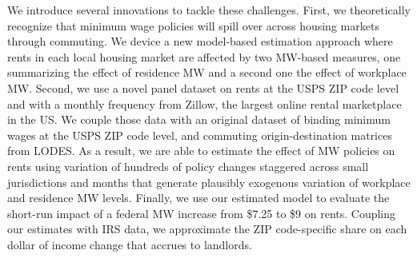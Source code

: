 We introduce several innovations to tackle these challenges.
First, we theoretically recognize that minimum wage policies will spill over across
housing markets through commuting.
We device a new model-based estimation approach where rents in each local housing 
market are affected by two MW-based measures, one summarizing the effect of residence 
MW and a second one the effect of workplace MW.
Second, we use a novel panel dataset on rents at the USPS ZIP code level and with a
monthly frequency from Zillow, the largest online rental marketplace in the US.
We couple those data with an original dataset of binding minimum wages at the USPS
ZIP code level, and commuting origin-destination matrices from LODES.
As a result, we are able to estimate the effect of MW policies on rents using 
variation of hundreds of policy changes staggered across small jurisdictions and 
months that generate plausibly exogenous variation of workplace and residence MW
levels.
Finally, we use our estimated model to evaluate the short-run impact of a federal 
MW increase from \$7.25 to \$9 on rents.
Coupling our estimates with IRS data, we approximate the ZIP code-specific share on 
each dollar of income change that accrues to landlords.



